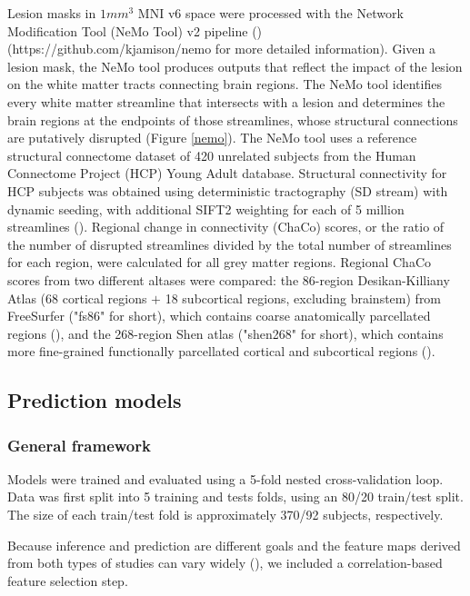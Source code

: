 \documentclass[10pt]{article}
\def\Plus{\texttt{+}}
\begin{document}
Lesion masks in $1mm^3$ MNI v6 space were processed with the Network Modification Tool (NeMo Tool) v2 pipeline (\cite{Kuceyeski2013-nk}) (https://github.com/kjamison/nemo for more detailed information). Given a lesion mask, the NeMo tool produces outputs that reflect the impact of the lesion on the white matter tracts connecting brain regions. The NeMo tool identifies every white matter streamline that intersects with a lesion and determines the brain regions at the endpoints of those streamlines, whose structural connections are putatively disrupted (Figure \ref{nemo}). The NeMo tool uses a reference structural connectome dataset of 420 unrelated subjects from the Human Connectome Project (HCP) Young Adult database. Structural connectivity for HCP subjects was obtained using deterministic tractography (SD stream) with dynamic seeding, with additional SIFT2 weighting for each of 5 million streamlines (\cite{Smith2015-eb}). Regional change in connectivity (ChaCo) scores, or the ratio of the number of disrupted streamlines divided by the total number of streamlines for each region, were calculated for all grey matter regions. Regional ChaCo scores from two different altases were compared: the 86-region Desikan-Killiany Atlas (68 cortical regions $\Plus$ 18 subcortical regions, excluding brainstem) from FreeSurfer ("fs86" for short), which contains coarse anatomically parcellated regions (\cite{Desikan2006-vf,Fischl2002-lb}), and the 268-region Shen atlas ("shen268" for short), which contains more fine-grained functionally parcellated cortical and subcortical regions (\cite{Shen2013-zn}).


\subsection{Prediction models}
\subsubsection*{General framework}

Models were trained and evaluated using a 5-fold nested cross-validation loop. Data was first split into 5 training and tests folds, using an 80/20 train/test split. The size of each train/test fold is approximately 370/92 subjects, respectively. 

Because inference and prediction are different goals and the feature maps derived from both types of studies can vary widely (\cite{Sperber2021-lw, Bzdok2020-py}), we included a correlation-based feature selection step. 
\end{document}
